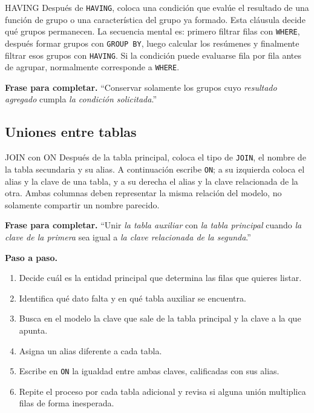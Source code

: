 \documentclass[11pt,a4paper]{article}
\newcommand{\campo}[1]{\texttt{#1}}
\begin{document}
\begin{plantilla}{HAVING}
Después de \campo{HAVING}, coloca una condición que evalúe el resultado de una función de grupo o una
característica del grupo ya formado. Esta cláusula decide qué grupos permanecen. La secuencia mental
es: primero filtrar filas con \campo{WHERE}, después formar grupos con \campo{GROUP BY}, luego
calcular los resúmenes y finalmente filtrar esos grupos con \campo{HAVING}. Si la condición puede
evaluarse fila por fila antes de agrupar, normalmente corresponde a \campo{WHERE}.

\textbf{Frase para completar.} ``Conservar solamente los grupos cuyo
\emph{resultado agregado} cumpla \emph{la condición solicitada}.''
\end{plantilla}

\subsection{Uniones entre tablas}

\begin{plantilla}{JOIN con ON}
Después de la tabla principal, coloca el tipo de \campo{JOIN}, el nombre de la tabla secundaria y su
alias. A continuación escribe \campo{ON}; a su izquierda coloca el alias y la clave de una tabla, y a
su derecha el alias y la clave relacionada de la otra. Ambas columnas deben representar la misma
relación del modelo, no solamente compartir un nombre parecido.

\textbf{Frase para completar.} ``Unir \emph{la tabla auxiliar} con \emph{la tabla principal} cuando
\emph{la clave de la primera} sea igual a \emph{la clave relacionada de la segunda}.''

\textbf{Paso a paso.}
\begin{enumerate}[label=\arabic*.]
  \item Decide cuál es la entidad principal que determina las filas que quieres listar.
  \item Identifica qué dato falta y en qué tabla auxiliar se encuentra.
  \item Busca en el modelo la clave que sale de la tabla principal y la clave a la que apunta.
  \item Asigna un alias diferente a cada tabla.
  \item Escribe en \campo{ON} la igualdad entre ambas claves, calificadas con sus alias.
  \item Repite el proceso por cada tabla adicional y revisa si alguna unión multiplica filas de forma
  inesperada.
\end{enumerate}
\end{plantilla}
\end{document}
